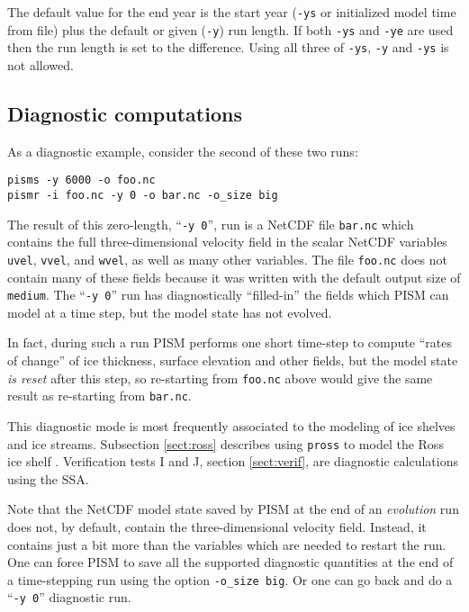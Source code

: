 The default value for the end year is the start year (\texttt{-ys} or initialized model time from file) plus the default or given (\texttt{-y}) run length.  If both \texttt{-ys} and \texttt{-ye} are used then the run length is set to the difference.  Using all three of \texttt{-ys}, \texttt{-y} and \texttt{-ys} is not allowed.


\subsection{Diagnostic computations}
\label{sec:diagnostic-computations}

 As a diagnostic example, consider the second of these two runs:
\begin{verbatim}
pisms -y 6000 -o foo.nc
pismr -i foo.nc -y 0 -o bar.nc -o_size big
\end{verbatim}

\noindent The result of this zero-length, ``\texttt{-y 0}'', run is a NetCDF file \texttt{bar.nc} which contains the full three-dimensional velocity field in the scalar NetCDF variables \texttt{uvel}, \texttt{vvel}, and \texttt{wvel}, as well as many other variables.  The file \texttt{foo.nc} does not contain many of these fields because it was written with the default output size of \texttt{medium}.  The ``\texttt{-y 0}'' run has diagnostically ``filled-in'' the fields which PISM can model at a time step, but the model state has not evolved.

In fact, during such a run PISM performs one short time-step to compute ``rates of change'' of ice thickness, surface elevation and other fields, but the model state \emph{is reset} after this step, so re-starting from \texttt{foo.nc} above would give the same result as re-starting from \texttt{bar.nc}.

This diagnostic mode is most frequently associated to the modeling of ice shelves and ice streams.  Subsection \ref{sect:ross} describes using \texttt{pross} to model the Ross ice shelf \cite{MacAyealetal}.  Verification tests I and J, section \ref{sect:verif}, are diagnostic calculations using the SSA.

Note that the NetCDF model state saved by PISM at the end of an \emph{evolution} run does not, by default, contain the three-dimensional velocity field.  Instead, it contains just a bit more than the variables which are needed to restart the run.  One can  force PISM to save all the supported diagnostic quantities at the end of a time-stepping run using the option \texttt{-o_size big}.  Or one can go back and do a ``\texttt{-y 0}'' diagnostic run.


